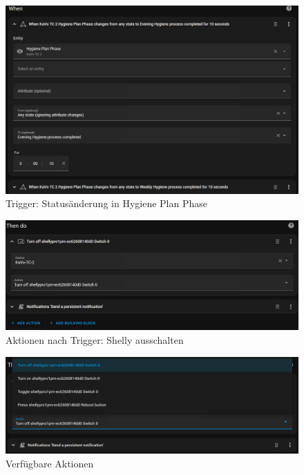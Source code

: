 \begin{figure}[H]
  \centering
  \includegraphics[width=\linewidth]{images/turnoff_trigger.png}
  \caption{Trigger: Statusänderung in Hygiene Plan Phase}
\end{figure}

\begin{figure}[H]
  \centering
  \includegraphics[width=\linewidth]{images/turnoff_action.png}
  \caption{Aktionen nach Trigger: Shelly ausschalten}
\end{figure}

\begin{figure}[H]
  \centering
  \includegraphics[width=\linewidth]{images/turnoff_actions.png}
  \caption{Verfügbare Aktionen}
\end{figure}


